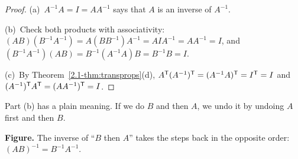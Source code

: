 \documentclass[11pt]{article}
\begin{document}
\begin{proof}
(a)~$A^{-1}A=I=AA^{-1}$ says that $A$ is an inverse of $A^{-1}$.

(b)~Check both products with associativity: $(AB)(B^{-1}A^{-1})=A(BB^{-1})A^{-1}=AIA^{-1}=AA^{-1}=I$, and $(B^{-1}A^{-1})(AB)=B^{-1}(A^{-1}A)B=B^{-1}B=I$.

(c)~By Theorem~\ref{2.1-thm:transprops}(d), $A^{\mathsf T}(A^{-1})^{\mathsf T}=(A^{-1}A)^{\mathsf T}=I^{\mathsf T}=I$ and $(A^{-1})^{\mathsf T} A^{\mathsf T}=(AA^{-1})^{\mathsf T}=I$.
\end{proof}

Part (b) has a plain meaning. If we do $B$ and then $A$, we undo it by undoing $A$ first and then $B$.

\begin{center}
\end{center}

\textbf{Figure.} The inverse of ``$B$ then $A$'' takes the steps back in the opposite order: $(AB)^{-1}=B^{-1}A^{-1}$.
\end{document}
